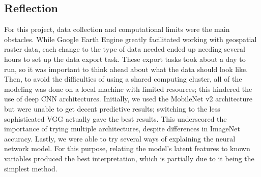 \documentclass[]{article}
\begin{document}
\subsection{Reflection}
For this project, data collection and computational limits were the main obstacles. While Google Earth Engine greatly facilitated working with geospatial raster data, each change to the type of data needed ended up needing several hours to set up the data export task. These export tasks took about a day to run, so it was important to think ahead about what the data should look like. Then, to avoid the difficulties of using a shared computing cluster, all of the modeling was done on a local machine with limited resources; this hindered the use of deep CNN architectures. Initially, we used the MobileNet v2 architecture but were unable to get decent predictive results; switching to the less sophisticated VGG actually gave the best results. This underscored the importance of trying multiple architectures, despite differences in ImageNet accuracy. Lastly, we were able to try several ways of explaining the neural network model. For this purpose, relating the model's latent features to known variables produced the best interpretation, which is partially due to it being the simplest method.
\end{document}
